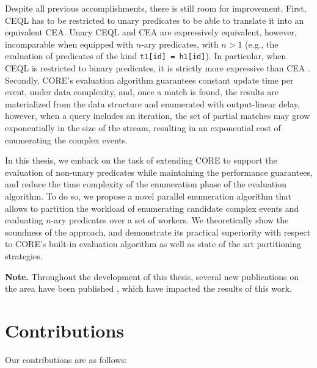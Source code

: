 Despite all previous accomplishments, there is still room for improvement. First, CEQL has to be restricted to unary predicates to be able to translate it into an equivalent CEA. Unary CEQL and CEA are expressively equivalent, however, incomparable when equipped with $n$-ary predicates, with $n > 1$ (e.g., the evaluation of predicates of the kind \texttt{t1[id] = h1[id]}). In particular, when CEQL is restricted to binary predicates, it is strictly more expressive than CEA \cite{on-the-expressiveness}. Secondly, CORE's evaluation algorithm guarantees constant update time per event, under data complexity, and, once a match is found, the results are materialized from the data structure and enumerated with output-linear delay, however, when a query includes an iteration, the set of partial matches may grow exponentially in the size of the stream, resulting in an exponential cost of enumerating the complex events.

In this thesis, we embark on the task of extending CORE to support the evaluation of non-unary predicates while maintaining the performance guarantees, and reduce the time complexity of the enumeration phase of the evaluation algorithm. To do so, we propose a novel parallel enumeration algorithm that allows to partition the workload of enumerating candidate complex events and evaluating $n$-ary predicates over a set of workers. We theoretically show the soundness of the approach, and demonstrate its practical superiority with respect to CORE's built-in evaluation algorithm as well as state of the art partitioning strategies.

\textbf{Note.} Throughout the development of this thesis, several new publications on the area have been published \cite{formal-framework-cer, core}, which have impacted the results of this work.

\section{Contributions}
\label{sec:contribution}

Our contributions are as follows:


